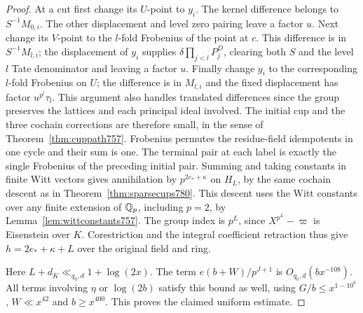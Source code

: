 \documentclass[a4paper,11pt]{article}
\theoremstyle{definition}
\theoremstyle{remark}
\numberwithin{equation}{section}
\begin{document}
\begin{proof}
At a cut first change its \(U\)-point to \(y_i\).
The kernel difference belongs to \(S^{-1}M_{0,i}\).
The other displacement and level zero pairing leave
a factor \(u\). Next change its \(V\)-point to the
\(l\)-fold Frobenius of the point at \(c\). This
difference is in \(S^{-1}M_{l,i}\); the displacement
of \(y_i\) supplies \(\delta\prod_{j<l}P_j^D\),
clearing both \(S\) and the level \(l\) Tate denominator
and leaving a factor \(u\). Finally change \(y_i\) to
the corresponding \(l\)-fold Frobenius on \(U\); the
difference is in \(M_{l,i}\) and the fixed displacement
has factor \(u^{p^l}\tau_l\).
This argument also handles translated differences since
the group preserves the lattices and each principal
ideal involved. The initial cup and the three cochain
corrections are therefore small, in the sense of
Theorem~\ref{thm:cuppath757}. Frobenius permutes the
residue-field idempotents in one cycle and their sum
is one. The terminal pair at each label is exactly the
single Frobenius of the preceding initial pair. Summing
and taking constants in finite Witt vectors gives
annihilation by \(p^{2e_*+\kappa}\) on \(H_L\), by the
same cochain descent as in Theorem~\ref{thm:sparsecups780}.
This descent uses the Witt constants over any finite
extension of \(\mathbb Q_p\), including \(p=2\), by
Lemma~\ref{lem:wittconstants757}. The group index is
\(p^L\), since \(X^{p^L}-\varpi\) is Eisenstein over
\(K\). Corestriction and the integral coefficient
retraction thus give \(h=2e_*+\kappa+L\) over the
original field and ring.

Here \(L+d_K\ll_{q_0,d}1+\log(2x)\). The term
\(e(b+W)/p^{J+1}\) is \(O_{q_0,d}(b x^{-108})\).
All terms involving \(\eta\) or \(\log(2b)\) satisfy
this bound as well, using \(G/b\le x^{1-10^6}\),
\(W\ll x^{42}\) and \(b\ge x^{400}\). This proves the
claimed uniform estimate.
\end{proof}
\end{document}
